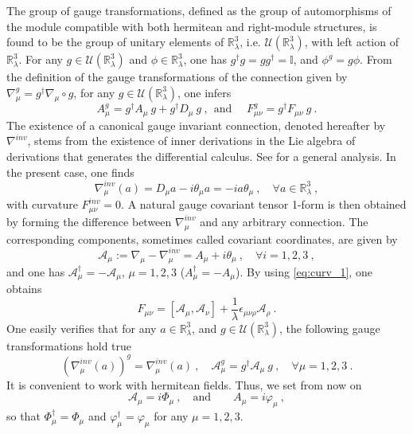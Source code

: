 \documentclass[11pt]{book}
\newcommand{\Ucal}{\mathcal{U}}
\newcommand{\Ibb}{\mathbb{I}}
\newcommand{\Rbb}{\mathbb{R}}
\theoremstyle{break}
\begin{document}
%
The group of gauge transformations, defined as the group of automorphisms of the module compatible with both hermitean and right-module structures, is found to be the group of unitary elements of $\Rbb^3_\lambda$, i.e. $\Ucal(\Rbb^3_\lambda)$, with left action of $\Rbb^3_\lambda$. For any $g\in\Ucal(\Rbb^3_\lambda)$ and $\phi\in\Rbb^3_\lambda$, one has $g^\dag g = gg^\dag = \Ibb$, and $\phi^g=g\phi$. From the definition of the gauge transformations of the connection given by $\nabla_\mu^g=g^\dag\nabla_\mu\circ g$, for any $g\in\mathcal{U}(\mathbb{R}^3_\lambda)$, one infers
%
\begin{equation*}
A_\mu^g = g^\dag A_\mu \ g + g^\dag D_\mu \ g \ , \ \ \mbox{and } \quad F^g_{\mu\nu} = g^\dag F_{\mu\nu} \ g \ \label{jauge-transfo}.
\end{equation*}
%
The existence of a canonical gauge invariant connection, denoted hereafter by $\nabla^{inv}$, stems from the existence of inner derivations in the Lie algebra of derivations that generates the differential calculus. See \cite{dubois_violette_lectures_1999} for a general analysis. In the present case, one finds
%
\begin{equation*} 
\nabla^{inv}_\mu(a) = D_\mu a - i \theta_\mu a = - i a \theta_\mu \ , \quad \forall a \in \mathbb{R}^3_\lambda \ , 
\end{equation*}
%
with curvature $F^{inv}_{\mu\nu}=0$. A natural gauge covariant tensor 1-form is then obtained by forming the difference between $\nabla^{inv}_\mu$ and any arbitrary connection. The corresponding components, sometimes called covariant coordinates, are given by%
%
\begin{equation*}
\mathcal{A}_\mu := \nabla_\mu - \nabla^{inv}_\mu = A_\mu + i \theta_\mu \ , \quad \forall i=1,2,3 \ , 
\end{equation*}
%
and one has $\mathcal{A}_\mu^\dag = - \mathcal{A}_\mu$, $\mu=1,2,3$ ($A_\mu^\dag=-A_\mu$). By using \eqref{eq:curv_1}, one obtains
%
\begin{equation} 
F_{\mu\nu} = \left[\mathcal{A}_\mu,\mathcal{A}_\nu\right] + \frac{1}{\lambda} \epsilon_{\mu\nu\rho} \mathcal{A}_\rho \ . 
\label{eq:curv_2}
\end{equation}
%
One easily verifies that for any $a\in\mathbb{R}^3_\lambda$, and $g\in\mathcal{U}(\mathbb{R}^3_\lambda)$, the following gauge transformations hold true%
%
\begin{equation*}
(\nabla^{inv}_\mu(a))^g = \nabla^{inv}_\mu(a) \ , \quad \mathcal{A}^g_\mu = g^\dag \mathcal{A}_\mu \ g \ , \quad \forall \mu=1,2,3 \ . \label{conection-invariace}
\end{equation*}
%
It is convenient to work with hermitean fields. Thus, we set from now on
%
\begin{equation*}
\mathcal{A}_\mu = i \Phi_\mu \ , \quad \mbox{and} \qquad  A_\mu = i \varphi_\mu \ ,
\end{equation*}
%
so that $\Phi^\dag_\mu = \Phi_\mu$ and $\varphi^\dag_\mu = \varphi_\mu$ for any $\mu=1,2,3$. 
\end{document}
